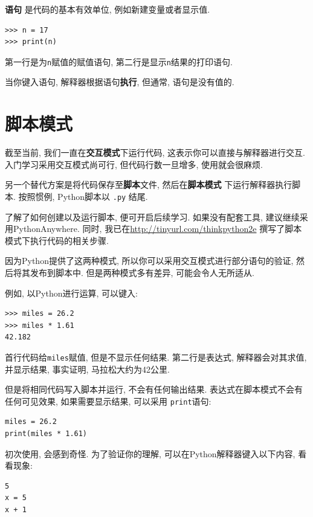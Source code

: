 \documentclass[10pt]{book}
\begin{document}
 {\bf 语句} 是代码的基本有效单位, 例如新建变量或者显示值. 

\begin{verbatim}
>>> n = 17
>>> print(n)
\end{verbatim}
%
第一行是为{\tt n}赋值的赋值语句, 第二行是显示{\tt n}结果的打印语句. 

当你键入语句, 解释器根据语句{\bf 执行}, 但通常, 语句是没有值的. 


\section{脚本模式}

截至当前, 我们一直在{\bf 交互模式}下运行代码, 
这表示你可以直接与解释器进行交互.
入门学习采用交互模式尚可行, 
但代码行数一旦增多, 使用就会很麻烦. 

另一个替代方案是将代码保存至{\bf 脚本}文件, 然后在{\bf 脚本模式}
下运行解释器执行脚本. 按照惯例, Python脚本以 {\tt .py} 结尾. 

了解了如何创建以及运行脚本, 便可开启后续学习. 
如果没有配套工具, 建议继续采用PythonAnywhere. 
同时, 我已在\url{http://tinyurl.com/thinkpython2e}
撰写了脚本模式下执行代码的相关步骤. 

因为Python提供了这两种模式,  
所以你可以采用交互模式进行部分语句的验证,
然后将其发布到脚本中. 
但是两种模式多有差异, 可能会令人无所适从. 

例如, 以Python进行运算, 可以键入:

\begin{verbatim}
>>> miles = 26.2
>>> miles * 1.61
42.182
\end{verbatim}

首行代码给{\tt miles}赋值, 但是不显示任何结果. 
第二行是表达式, 解释器会对其求值, 并显示结果, 
事实证明, 马拉松大约为42公里. 

但是将相同代码写入脚本并运行, 不会有任何输出结果. 
表达式在脚本模式不会有任何可见效果, 如果需要显示结果, 
可以采用 {\tt print}语句: 

\begin{verbatim}
miles = 26.2
print(miles * 1.61)
\end{verbatim}

初次使用, 会感到奇怪. 为了验证你的理解, 
可以在Python解释器键入以下内容, 看看现象:

\begin{verbatim}
5
x = 5
x + 1
\end{verbatim}
\end{document}
